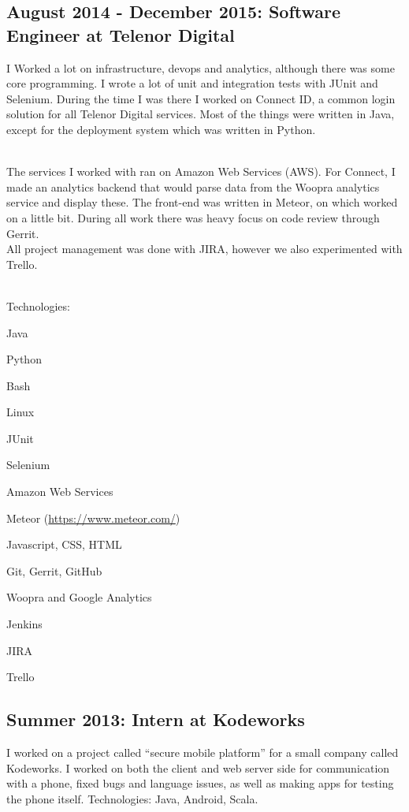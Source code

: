 \documentclass[letterpaper]{article}
\renewenvironment{itemize}{
  \begin{list}{}{
    \setlength{\leftmargin}{1.5em}
  }
}{
  \end{list}
}
\begin{document}
\subsection*{August 2014 - December 2015: Software Engineer at Telenor Digital}
I Worked a lot on infrastructure, devops and analytics, although there was some core programming. I wrote a lot of unit and integration tests with JUnit and Selenium. During the time I was there I worked on Connect ID, a common login solution for all Telenor Digital services. Most of the things were written in Java, except for the deployment system which was written in Python.

~\\
The services I worked with ran on Amazon Web Services (AWS). For Connect, I made an analytics backend that would parse data from the Woopra analytics service and display these. The front-end was written in Meteor, on which worked on a little bit. During all work there was heavy focus on code review through Gerrit.
~\\

All project management was done with JIRA, however we also experimented with Trello.

~\\
Technologies:
\begin{itemize}
\item Java
\item Python
\item Bash
\item Linux
\item JUnit
\item Selenium
\item Amazon Web Services
\item Meteor (\url{https://www.meteor.com/})
\item Javascript, CSS, HTML
\item Git, Gerrit, GitHub
\item Woopra and Google Analytics
\item Jenkins
\item JIRA
\item Trello
\end{itemize}

\subsection*{Summer 2013: Intern at Kodeworks}
I worked on a project called ``secure mobile platform'' for a small company
called Kodeworks. I worked on both the client and web
server side for communication with a phone, fixed bugs and language
issues, as well as making apps for testing the phone itself. Technologies: Java, Android, Scala.
\end{document}
